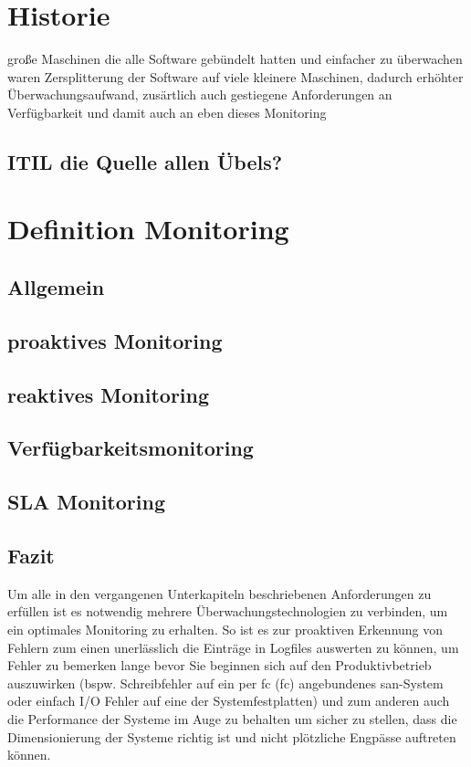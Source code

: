 \documentclass[12pt,a4paper,parskip]{scrreprt}
\begin{document}
	\section{Historie}
	große Maschinen die alle Software gebündelt hatten und einfacher zu überwachen waren
	Zersplitterung der Software auf viele kleinere Maschinen, dadurch erhöhter Überwachungsaufwand, zusärtlich auch gestiegene Anforderungen an Verfügbarkeit und damit auch an eben dieses Monitoring
	\subsection{ITIL die Quelle allen Übels?}
	\section{Definition Monitoring}
	\subsection{Allgemein}
	\subsection{proaktives Monitoring}
	\subsection{reaktives Monitoring}
	\subsection{Verfügbarkeitsmonitoring}
	\subsection{SLA Monitoring}
	\subsection{Fazit}
	Um alle in den vergangenen Unterkapiteln beschriebenen Anforderungen zu erfüllen ist es notwendig mehrere Überwachungstechnologien zu verbinden, um ein optimales Monitoring zu erhalten. So ist es zur proaktiven Erkennung von Fehlern zum einen unerlässlich die Einträge in Logfiles auswerten zu können, um Fehler zu bemerken lange bevor Sie beginnen sich auf den Produktivbetrieb auszuwirken (bspw. Schreibfehler auf ein per \acrlong{fc} (\acrshort{fc}) angebundenes \gls{san}-System oder einfach I/O Fehler auf eine der Systemfestplatten) und zum anderen auch die Performance der Systeme im Auge zu behalten um sicher zu stellen, dass die Dimensionierung der Systeme richtig ist und nicht plötzliche Engpässe auftreten können.
\end{document}

